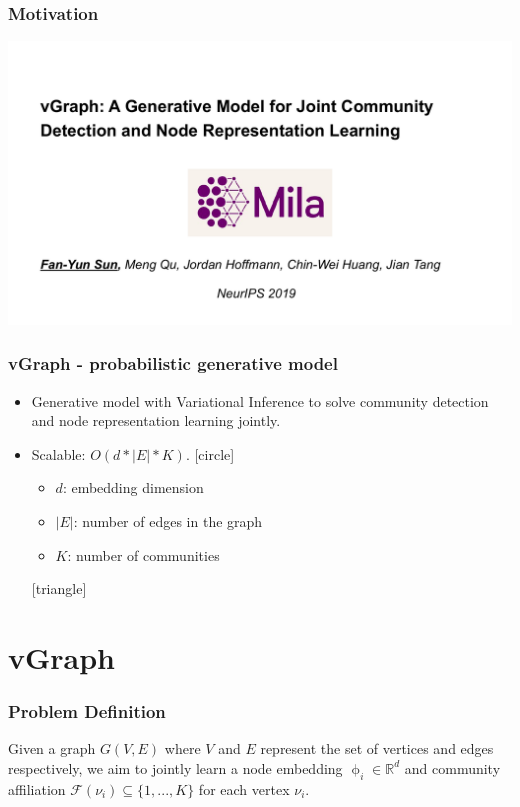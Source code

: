 \documentclass[12pt,aspectratio=169]{beamer}
\begin{document}
    \begin{frame}
        \frametitle{Motivation}

        \centering
        \includegraphics[page=5,trim=2cm 0 2cm 3cm,clip,scale=0.6]{vGraph_slides.pdf}
    \end{frame}

    \begin{frame}
        \frametitle{vGraph - probabilistic generative model}

        \begin{itemize}
            \setlength{\itemsep}{.8em}
            \item Generative model with Variational Inference to solve community detection and node representation learning jointly.
            \item Scalable: $O(d * |E| * K)$.
            [circle]
                \begin{itemize} 
                    \item $d$: embedding dimension
                    \item $|E|$: number of edges in the graph
                    \item $K$: number of communities
                \end{itemize}
            [triangle]
        \end{itemize}
    \end{frame}

    \section{vGraph}

    \begin{frame}
        \frametitle{Problem Definition}

        Given a graph $G(V, E)$ where $V$ and $E$ represent the set of vertices and edges respectively, we aim to jointly
        learn a node embedding $\upphi_i \in \mathbb{R}^d$ and community affiliation $\mathcal{F}(\nu_i) \subseteq \{1, ..., K\}$
        for each vertex $\nu_i$.
    \end{frame}
\end{document}
